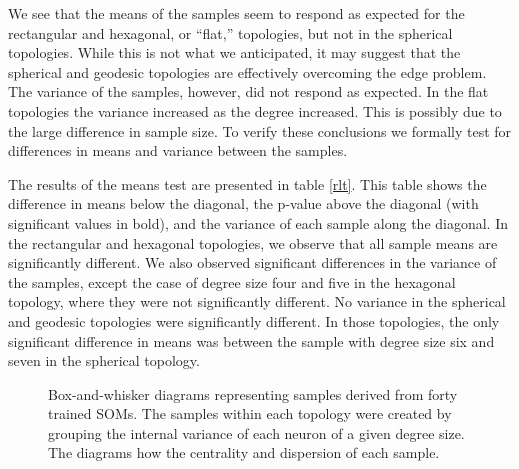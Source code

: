 We see that the means of the samples seem to respond as expected for the
rectangular and hexagonal, or ``flat,''  topologies, but not in the spherical
topologies.  While this is not what we anticipated, it may suggest that the
spherical and geodesic topologies are effectively overcoming the edge problem.
The variance of the samples, however, did not respond as expected.  In the
flat topologies the variance increased as the degree increased.  This is
possibly due to the large difference in sample size.  To verify these
conclusions we formally test for differences in means and variance between the
samples.

The results of the means test are presented in table \ref{rlt}. This table
shows the difference in means below the diagonal, the p-value above the
diagonal (with significant values in bold), and the variance of each
sample along the diagonal.  In the rectangular and hexagonal topologies, we
observe that all sample means are significantly different.  We also observed
significant differences in the variance of the samples, except the case of
degree size four and five in the hexagonal topology, where they were not
significantly different. No variance in the spherical and geodesic topologies
were significantly different.  In those topologies, the only significant
difference in means was between the sample with degree size six and seven in
the spherical topology.

\begin{figure}
\centering
{}
\caption{Box-and-whisker diagrams representing samples derived from forty
trained SOMs.  The samples within each topology were created by grouping the
internal variance of each neuron of a given degree size. The diagrams how the
centrality and dispersion of each sample.}
\label{boxplot}
\end{figure}


